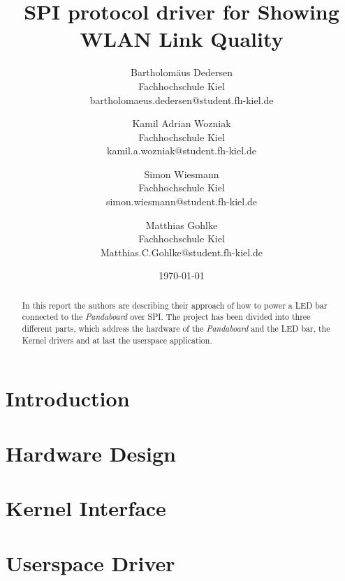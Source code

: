 \documentclass[bibtotocnumbered, headsepline,normalheadings]{report}
\begin{document}
\author{ 
Bartholomäus Dedersen \\ Fachhochschule Kiel \\ bartholomaeus.dedersen@student.fh-kiel.de \and
Kamil Adrian Wozniak \\ Fachhochschule Kiel \\ kamil.a.wozniak@student.fh-kiel.de \and
Simon Wiesmann \\ Fachhochschule Kiel \\ simon.wiesmann@student.fh-kiel.de \and 
Matthias Gohlke \\ Fachhochschule Kiel \\ Matthias.C.Gohlke@student.fh-kiel.de}

\date{\today} 
\title{SPI protocol driver for Showing WLAN Link Quality} 

\maketitle


\begin{abstract}
In this report the authors are describing their approach of how to power a LED bar connected to the \textit{Pandaboard} over SPI. The project has been divided into three different parts, which address the hardware of the \textit{Pandaboard} and the LED bar, the Kernel drivers and at last the userspace application.
\end{abstract}

\tableofcontents \newpage

\chapter{Introduction}



\chapter{Hardware Design}
\label{chap:hardware}



\chapter{Kernel Interface}
\label{chap:kernel}


\chapter{Userspace Driver}
\label{chap:userspace}

\end{document}
